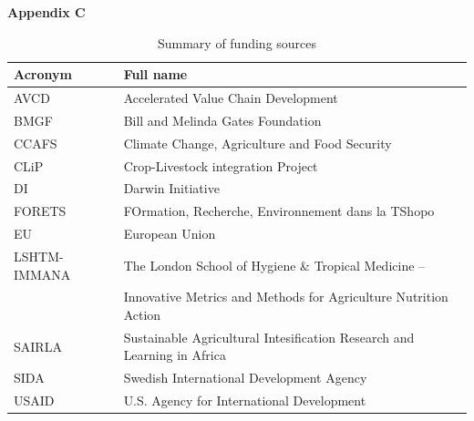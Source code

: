 \textbf{Appendix C}

\begin{table}[H]
  \captionsetup{singlelinecheck = false, justification=justified}
\caption{Summary of funding sources}
\label{tab:C_1}
\small
\begin{tabularx}{\textwidth}{@{}ll@{}}
  \toprule
  Acronym & Full name\\
  \midrule
  AVCD & Accelerated Value Chain Development\\
  BMGF & Bill and Melinda Gates Foundation\\
  CCAFS & Climate Change, Agriculture and Food Security\\
  CLiP & Crop-Livestock integration Project\\
  DI & Darwin Initiative\\
  FORETS & FOrmation, Recherche, Environnement dans la TShopo\\
  EU & European Union\\
  LSHTM-IMMANA & The London School of Hygiene \& Tropical Medicine --\\
   & Innovative Metrics and Methods for Agriculture Nutrition Action\\
  SAIRLA & Sustainable Agricultural Intesification Research and Learning in Africa\\
  SIDA & Swedish International Development Agency\\
  USAID & U.S. Agency for International Development\\
\bottomrule
\end{tabularx}
\end{table}

\vspace*{\fill}


